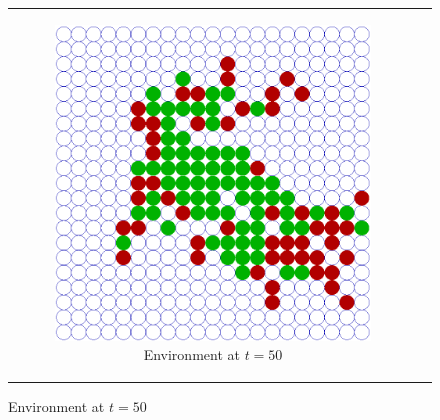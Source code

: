 \begin{figure}
\begin{center}
	\begin{tabular}{c c}
		\begin{subfigure}[b]{0.2\textwidth}
			\centering
			\includegraphics[width=1\textwidth, angle=0]{./fig/SIR_Dunai/SIR_Dunai_dt001_environment.png}
			\caption{Environment at $t = 50$}
			\label{fig:sir_dunai_env}
		\end{subfigure}
    	
    	&
  

\end{tabular}
\end{center}
\end{figure}
